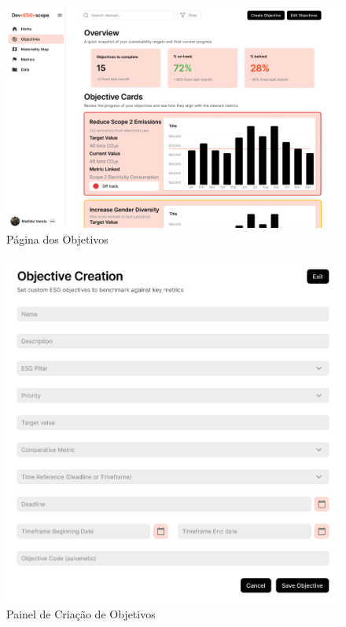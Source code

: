 \begin{figure}[H]
    \centering
    \includegraphics[width=\linewidth]{frontmatter/assets/mockup/Objective Tracking + Comparision with current Metrics.png}
    \caption{Página dos Objetivos}
    \label{fig:objectivePage}
\end{figure}

\begin{figure}[H]
    \centering
    \includegraphics[width=\linewidth]{frontmatter/assets/mockup/Objective Creation.png}
    \caption{Painel de Criação de Objetivos}
    \label{fig:customObjectiveModal}
\end{figure}